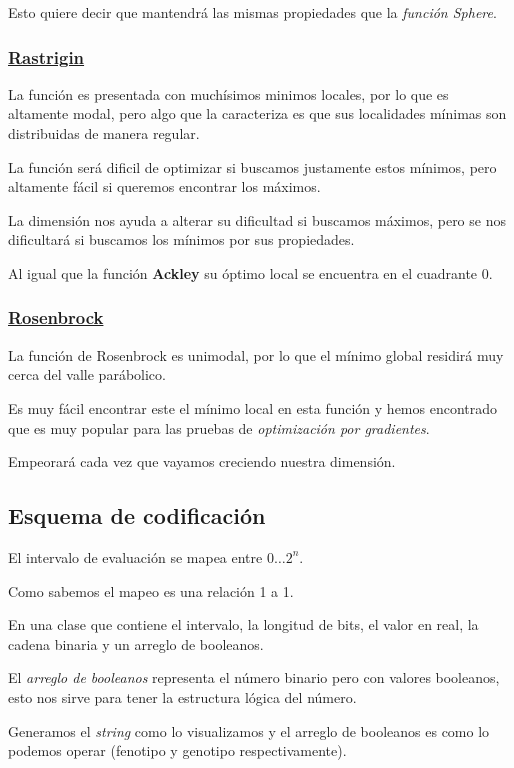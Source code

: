 \documentclass{article}
\begin{document}
Esto quiere decir que mantendrá las mismas propiedades que la \textit{función Sphere}.

\subsubsection*{\href{https://www.sfu.ca/~ssurjano/rastr.html}{Rastrigin}}
La función es presentada con muchísimos minimos locales, por lo que es altamente modal, pero algo que la caracteriza es que sus localidades
mínimas son distribuidas de manera regular.

La función será dificil de optimizar si buscamos justamente estos mínimos, pero altamente fácil si queremos encontrar los máximos.

La dimensión nos ayuda a alterar su dificultad si buscamos máximos, pero se nos dificultará si buscamos los mínimos por sus propiedades.

Al igual que la función \textbf{Ackley} su óptimo local se encuentra en el cuadrante 0.

\subsubsection*{\href{https://www.sfu.ca/~ssurjano/rosen.html}{Rosenbrock}}
La función de Rosenbrock es unimodal, por lo que el mínimo global residirá muy cerca del valle parábolico.

Es muy fácil encontrar este el mínimo local en esta función y hemos encontrado que es muy popular para las pruebas
de \textit{optimización por gradientes}.

Empeorará cada vez que vayamos creciendo nuestra dimensión.

\subsection*{Esquema de codificación}
El intervalo de evaluación se mapea entre $0 \dots 2^n$.

Como sabemos el mapeo es una relación 1 a 1.

En una clase que contiene el intervalo, la longitud de bits, el valor en real, la cadena binaria y un arreglo de booleanos.

El \textit{arreglo de booleanos} representa el número binario pero con valores booleanos, esto nos sirve para tener la estructura lógica del número.

Generamos el \textit{string} como lo visualizamos y el arreglo de booleanos es como lo podemos operar (fenotipo y genotipo respectivamente).
\end{document}
